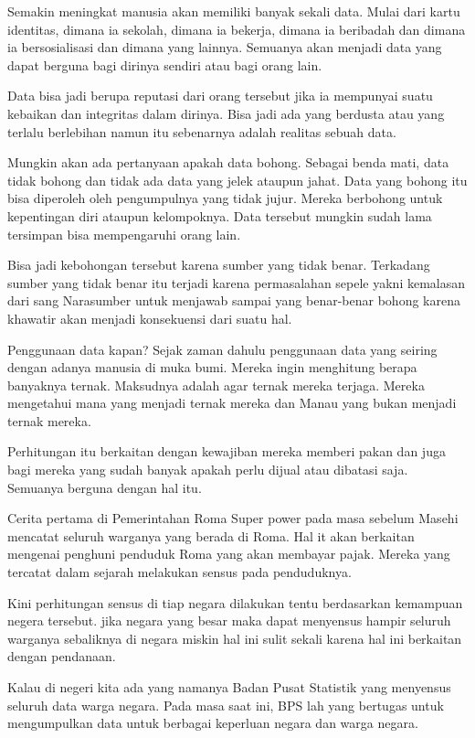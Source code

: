 \documentclass[
]{book}
\theoremstyle{definition}
\theoremstyle{definition}
\theoremstyle{definition}
\theoremstyle{definition}
\theoremstyle{remark}
\begin{document}
Semakin meningkat manusia akan memiliki banyak sekali data. Mulai dari kartu identitas, dimana ia sekolah, dimana ia bekerja, dimana ia beribadah dan dimana ia bersosialisasi dan dimana yang lainnya. Semuanya akan menjadi data yang dapat berguna bagi dirinya sendiri atau bagi orang lain.

Data bisa jadi berupa reputasi dari orang tersebut jika ia mempunyai suatu kebaikan dan integritas dalam dirinya. Bisa jadi ada yang berdusta atau yang terlalu berlebihan namun itu sebenarnya adalah realitas sebuah data.

Mungkin akan ada pertanyaan apakah data bohong. Sebagai benda mati, data tidak bohong dan tidak ada data yang jelek ataupun jahat. Data yang bohong itu bisa diperoleh oleh pengumpulnya yang tidak jujur. Mereka berbohong untuk kepentingan diri ataupun kelompoknya. Data tersebut mungkin sudah lama tersimpan bisa mempengaruhi orang lain.

Bisa jadi kebohongan tersebut karena sumber yang tidak benar. Terkadang sumber yang tidak benar itu terjadi karena permasalahan sepele yakni kemalasan dari sang Narasumber untuk menjawab sampai yang benar-benar bohong karena khawatir akan menjadi konsekuensi dari suatu hal.

Penggunaan data kapan? Sejak zaman dahulu penggunaan data yang seiring dengan adanya manusia di muka bumi. Mereka ingin menghitung berapa banyaknya ternak. Maksudnya adalah agar ternak mereka terjaga. Mereka mengetahui mana yang menjadi ternak mereka dan Manau yang bukan menjadi ternak mereka.

Perhitungan itu berkaitan dengan kewajiban mereka memberi pakan dan juga bagi mereka yang sudah banyak apakah perlu dijual atau dibatasi saja. Semuanya berguna dengan hal itu.

Cerita pertama di Pemerintahan Roma Super power pada masa sebelum Masehi mencatat seluruh warganya yang berada di Roma. Hal it akan berkaitan mengenai penghuni penduduk Roma yang akan membayar pajak. Mereka yang tercatat dalam sejarah melakukan sensus pada penduduknya.

Kini perhitungan sensus di tiap negara dilakukan tentu berdasarkan kemampuan negera tersebut. jika negara yang besar maka dapat menyensus hampir seluruh warganya sebaliknya di negara miskin hal ini sulit sekali karena hal ini berkaitan dengan pendanaan.

Kalau di negeri kita ada yang namanya Badan Pusat Statistik yang menyensus seluruh data warga negara. Pada masa saat ini, BPS lah yang bertugas untuk mengumpulkan data untuk berbagai keperluan negara dan warga negara.
\end{document}
